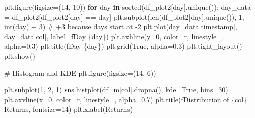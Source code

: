 \documentclass[
  letterpaper,
  DIV=11,
  numbers=noendperiod]{scrartcl}
\newenvironment{Shaded}{\begin{snugshade}}{\end{snugshade}}
\newcommand{\BuiltInTok}[1]{\textcolor[rgb]{0.00,0.23,0.31}{#1}}
\newcommand{\CommentTok}[1]{\textcolor[rgb]{0.37,0.37,0.37}{#1}}
\newcommand{\ControlFlowTok}[1]{\textcolor[rgb]{0.00,0.23,0.31}{\textbf{#1}}}
\newcommand{\DecValTok}[1]{\textcolor[rgb]{0.68,0.00,0.00}{#1}}
\newcommand{\FloatTok}[1]{\textcolor[rgb]{0.68,0.00,0.00}{#1}}
\newcommand{\KeywordTok}[1]{\textcolor[rgb]{0.00,0.23,0.31}{\textbf{#1}}}
\newcommand{\NormalTok}[1]{\textcolor[rgb]{0.00,0.23,0.31}{#1}}
\newcommand{\OperatorTok}[1]{\textcolor[rgb]{0.37,0.37,0.37}{#1}}
\newcommand{\SpecialCharTok}[1]{\textcolor[rgb]{0.37,0.37,0.37}{#1}}
\newcommand{\SpecialStringTok}[1]{\textcolor[rgb]{0.13,0.47,0.30}{#1}}
\newcommand{\StringTok}[1]{\textcolor[rgb]{0.13,0.47,0.30}{#1}}
\newcommand{\VariableTok}[1]{\textcolor[rgb]{0.07,0.07,0.07}{#1}}
\begin{document}
\begin{Shaded}
\begin{Highlighting}[]
\NormalTok{    plt.figure(figsize}\OperatorTok{=}\NormalTok{(}\DecValTok{14}\NormalTok{, }\DecValTok{10}\NormalTok{))}
    \ControlFlowTok{for}\NormalTok{ day }\KeywordTok{in} \BuiltInTok{sorted}\NormalTok{(df\_plot2[}\StringTok{\textquotesingle{}day\textquotesingle{}}\NormalTok{].unique()):}
\NormalTok{        day\_data }\OperatorTok{=}\NormalTok{ df\_plot2[df\_plot2[}\StringTok{\textquotesingle{}day\textquotesingle{}}\NormalTok{] }\OperatorTok{==}\NormalTok{ day]}
\NormalTok{        plt.subplot(}\BuiltInTok{len}\NormalTok{(df\_plot2[}\StringTok{\textquotesingle{}day\textquotesingle{}}\NormalTok{].unique()), }\DecValTok{1}\NormalTok{, }\BuiltInTok{int}\NormalTok{(day) }\OperatorTok{+} \DecValTok{3}\NormalTok{)  }\CommentTok{\# +3 because days start at {-}2}
\NormalTok{        plt.plot(day\_data[}\StringTok{\textquotesingle{}timestamp\textquotesingle{}}\NormalTok{], day\_data[col], label}\OperatorTok{=}\SpecialStringTok{f\textquotesingle{}Day }\SpecialCharTok{\{}\NormalTok{day}\SpecialCharTok{\}}\SpecialStringTok{\textquotesingle{}}\NormalTok{)}
\NormalTok{        plt.axhline(y}\OperatorTok{=}\DecValTok{0}\NormalTok{, color}\OperatorTok{=}\StringTok{\textquotesingle{}r\textquotesingle{}}\NormalTok{, linestyle}\OperatorTok{=}\StringTok{\textquotesingle{}{-}\textquotesingle{}}\NormalTok{, alpha}\OperatorTok{=}\FloatTok{0.3}\NormalTok{)}
\NormalTok{        plt.title(}\SpecialStringTok{f\textquotesingle{}Day }\SpecialCharTok{\{}\NormalTok{day}\SpecialCharTok{\}}\SpecialStringTok{\textquotesingle{}}\NormalTok{)}
\NormalTok{        plt.grid(}\VariableTok{True}\NormalTok{, alpha}\OperatorTok{=}\FloatTok{0.3}\NormalTok{)}
\NormalTok{    plt.tight\_layout()}
\NormalTok{    plt.show()}

    \CommentTok{\# Histogram and KDE}
\NormalTok{    plt.figure(figsize}\OperatorTok{=}\NormalTok{(}\DecValTok{14}\NormalTok{, }\DecValTok{6}\NormalTok{))}

\NormalTok{    plt.subplot(}\DecValTok{1}\NormalTok{, }\DecValTok{2}\NormalTok{, }\DecValTok{1}\NormalTok{)}
\NormalTok{    sns.histplot(df\_m[col].dropna(), kde}\OperatorTok{=}\VariableTok{True}\NormalTok{, bins}\OperatorTok{=}\DecValTok{30}\NormalTok{)}
\NormalTok{    plt.axvline(x}\OperatorTok{=}\DecValTok{0}\NormalTok{, color}\OperatorTok{=}\StringTok{\textquotesingle{}r\textquotesingle{}}\NormalTok{, linestyle}\OperatorTok{=}\StringTok{\textquotesingle{}{-}{-}\textquotesingle{}}\NormalTok{, alpha}\OperatorTok{=}\FloatTok{0.7}\NormalTok{)}
\NormalTok{    plt.title(}\SpecialStringTok{f\textquotesingle{}Distribution of }\SpecialCharTok{\{}\NormalTok{col}\SpecialCharTok{\}}\SpecialStringTok{ Returns\textquotesingle{}}\NormalTok{, fontsize}\OperatorTok{=}\DecValTok{14}\NormalTok{)}
\NormalTok{    plt.xlabel(}\StringTok{\textquotesingle{}Returns\textquotesingle{}}\NormalTok{)}


\end{Highlighting}
\end{Shaded}
\end{document}
